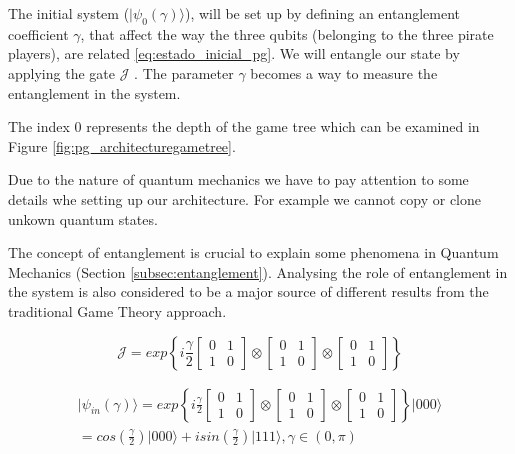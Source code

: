 The initial system ($\vert \psi_{0}(\gamma) \rangle$), will be set up by defining an entanglement coefficient $\gamma$, that affect the way the three qubits (belonging to the three pirate players), are related \ref{eq:estado_inicial_pg}. 
We will entangle our state by applying the gate $\mathcal{J}$ \cite{Letters2002}. The parameter $\gamma$ becomes a way to measure the entanglement in the system\cite{Eisert2008}.

The index $0$ represents the depth of the game tree which can be examined in Figure \ref{fig:pg_architecturegametree}.

Due to the nature of quantum mechanics we have to pay attention to some details whe setting up our architecture. For example we cannot copy or clone unkown quantum states\cite{Rieffel2011}. 

The concept of entanglement is crucial to explain some phenomena in Quantum Mechanics (Section \ref{subsec:entanglement}). Analysing the role of entanglement in the system is also considered to be a major source of different results from the traditional Game Theory approach\cite{Fra2011a}\cite{Fra2011}\cite{Letters2002}\cite{Khan2011}\cite{Ricketts2006}. 


\begin{equation}
\label{eq:matrix_exponencial_esoterica}
\mathcal{J}=exp\left\{ i\frac{\gamma}{2}\left[\begin{array}{cc}
0 & 1\\
1 & 0
\end{array}\right]\otimes\left[\begin{array}{cc}
0 & 1\\
1 & 0
\end{array}\right]
\otimes\left[\begin{array}{cc}
0 & 1\\
1 & 0
\end{array}\right]
\right\}
\end{equation} 

\begin{equation}
\label{eq:estado_inicial_pg}
\begin{split}
\vert\psi_{in}(\gamma)\rangle=exp\left\{ i\frac{\gamma}{2}\left[\begin{array}{cc}
0 & 1\\
1 & 0
\end{array}\right]\otimes\left[\begin{array}{cc}
0 & 1\\
1 & 0
\end{array}\right]\otimes\left[\begin{array}{cc}
0 & 1\\
1 & 0
\end{array}\right]\right\} \vert000\rangle \\
=cos(\frac{\gamma}{2})\vert000\rangle+isin(\frac{\gamma}{2})\vert111\rangle,\gamma\in(0,\pi)
\end{split}
\end{equation}



